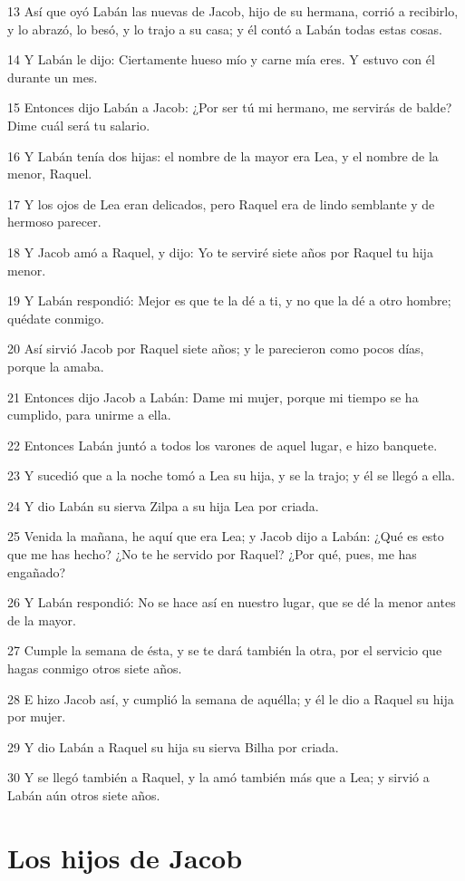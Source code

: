 13 Así que oyó Labán las nuevas de Jacob, hijo de su hermana, corrió a recibirlo, y lo abrazó, lo besó, y lo trajo a su casa; y él contó a Labán todas estas cosas.

14 Y Labán le dijo: Ciertamente hueso mío y carne mía eres. Y estuvo con él durante un mes.

15 Entonces dijo Labán a Jacob: ¿Por ser tú mi hermano, me servirás de balde? Dime cuál será tu salario.

16 Y Labán tenía dos hijas: el nombre de la mayor era Lea, y el nombre de la menor, Raquel.

17 Y los ojos de Lea eran delicados, pero Raquel era de lindo semblante y de hermoso parecer.

18 Y Jacob amó a Raquel, y dijo: Yo te serviré siete años por Raquel tu hija menor.

19 Y Labán respondió: Mejor es que te la dé a ti, y no que la dé a otro hombre; quédate conmigo.

20 Así sirvió Jacob por Raquel siete años; y le parecieron como pocos días, porque la amaba.

21 Entonces dijo Jacob a Labán: Dame mi mujer, porque mi tiempo se ha cumplido, para unirme a ella.

22 Entonces Labán juntó a todos los varones de aquel lugar, e hizo banquete.

23 Y sucedió que a la noche tomó a Lea su hija, y se la trajo; y él se llegó a ella.

24 Y dio Labán su sierva Zilpa a su hija Lea por criada.

25 Venida la mañana, he aquí que era Lea; y Jacob dijo a Labán: ¿Qué es esto que me has hecho? ¿No te he servido por Raquel? ¿Por qué, pues, me has engañado?

26 Y Labán respondió: No se hace así en nuestro lugar, que se dé la menor antes de la mayor.

27 Cumple la semana de ésta, y se te dará también la otra, por el servicio que hagas conmigo otros siete años.

28 E hizo Jacob así, y cumplió la semana de aquélla; y él le dio a Raquel su hija por mujer.

29 Y dio Labán a Raquel su hija su sierva Bilha por criada.

30 Y se llegó también a Raquel, y la amó también más que a Lea; y sirvió a Labán aún otros siete años.

\section{Los hijos de Jacob}

